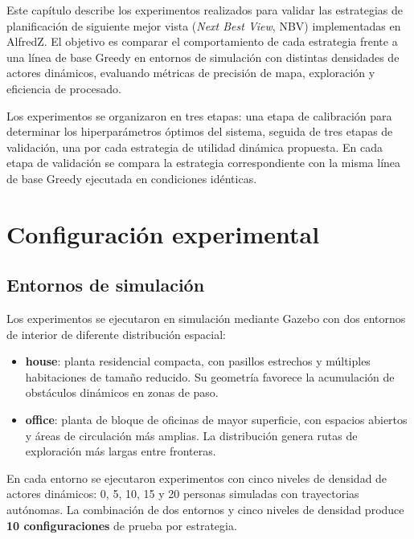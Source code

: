 Este capítulo describe los experimentos realizados para validar las estrategias de planificación de siguiente mejor vista (\textit{Next Best View}, NBV) implementadas en AlfredZ. El objetivo es comparar el comportamiento de cada estrategia frente a una línea de base Greedy en entornos de simulación con distintas densidades de actores dinámicos, evaluando métricas de precisión de mapa, exploración y eficiencia de procesado.

Los experimentos se organizaron en tres etapas: una etapa de calibración para determinar los hiperparámetros óptimos del sistema, seguida de tres etapas de validación, una por cada estrategia de utilidad dinámica propuesta. En cada etapa de validación se compara la estrategia correspondiente con la misma línea de base Greedy ejecutada en condiciones idénticas.

\section{Configuración experimental}

\subsection{Entornos de simulación}

Los experimentos se ejecutaron en simulación mediante Gazebo con dos entornos de interior de diferente distribución espacial:

\begin{itemize}
    \item \textbf{house}: planta residencial compacta, con pasillos estrechos y múltiples habitaciones de tamaño reducido. Su geometría favorece la acumulación de obstáculos dinámicos en zonas de paso.
    \item \textbf{office}: planta de bloque de oficinas de mayor superficie, con espacios abiertos y áreas de circulación más amplias. La distribución genera rutas de exploración más largas entre fronteras.
\end{itemize}

En cada entorno se ejecutaron experimentos con cinco niveles de densidad de actores dinámicos: 0, 5, 10, 15 y 20 personas simuladas con trayectorias autónomas. La combinación de dos entornos y cinco niveles de densidad produce \textbf{10 configuraciones} de prueba por estrategia.

